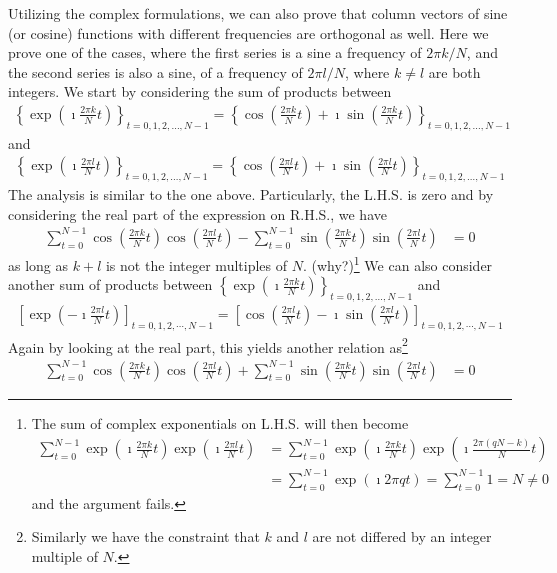 Utilizing the complex formulations, we can also prove that column vectors of sine (or cosine) functions with different frequencies are orthogonal as well. Here we prove one of the cases, where the first series is a sine a frequency of $2\pi k/N$, and the second series is also a sine, of a frequency of $2\pi l/N$, where $k \neq l$ are both integers. We start by considering the sum of products between
\begin{align*}
\left\{\exp(\imath \frac{2\pi k}{N} t)\right\}_{t = 0,1,2,\ldots,N-1} = \left\{\cos(\frac{2\pi k}{N} t) + \imath\sin(\frac{2\pi k}{N} t) \right\}_{t = 0,1,2,\ldots,N-1}   
\end{align*}
and
\begin{align*}
\left\{\exp(\imath \frac{2\pi l}{N} t)\right\}_{t = 0,1,2,\ldots,N-1} = \left\{\cos(\frac{2\pi l}{N} t) + \imath\sin(\frac{2\pi l}{N} t) \right\}_{t = 0,1,2,\ldots,N-1}   
\end{align*}
The analysis is similar to the one above. Particularly, the L.H.S. is zero and by considering the real part of the expression on R.H.S., we have
\begin{align}
\sum_{t=0}^{N-1} \cos(\frac{2\pi k}{N} t)\cos(\frac{2\pi l}{N} t) - \sum_{t=0}^{N-1} \sin(\frac{2\pi k}{N} t)\sin(\frac{2\pi l}{N} t) &= 0 \label{eqn:cossinmixed1}
\end{align}
as long as $k + l$ is not the integer multiples of $N$. (why?)\footnote{The sum of complex exponentials on L.H.S. will then become
\begin{align*}
\sum_{t=0}^{N-1} \exp(\imath \frac{2\pi k}{N} t) \exp(\imath \frac{2\pi l}{N} t) &= \sum_{t=0}^{N-1} \exp(\imath \frac{2\pi k}{N} t) \exp(\imath \frac{2\pi (qN - k)}{N} t) \\
&= \sum_{t=0}^{N-1} \exp(\imath 2\pi q t) = \sum_{t=0}^{N-1} 1 = N \neq 0
\end{align*}
and the argument fails.} We can also consider another sum of products between $\left\{\exp(\imath \frac{2\pi k}{N} t)\right\}_{t = 0,1,2,\ldots,N-1}$ and
\begin{align*}
\left[\exp(-\imath \frac{2\pi l}{N} t)\right]_{t = 0,1,2,\cdots,N-1} = \left[\cos(\frac{2\pi l}{N} t) - \imath\sin(\frac{2\pi l}{N} t) \right]_{t = 0,1,2,\cdots,N-1}       
\end{align*}
Again by looking at the real part, this yields another relation as\footnote{Similarly we have the constraint that $k$ and $l$ are not differed by an integer multiple of $N$.}
\begin{align}
\sum_{t=0}^{N-1} \cos(\frac{2\pi k}{N} t)\cos(\frac{2\pi l}{N} t) + \sum_{t=0}^{N-1} \sin(\frac{2\pi k}{N} t)\sin(\frac{2\pi l}{N} t) &= 0 \label{eqn:cossinmixed2}
\end{align}
